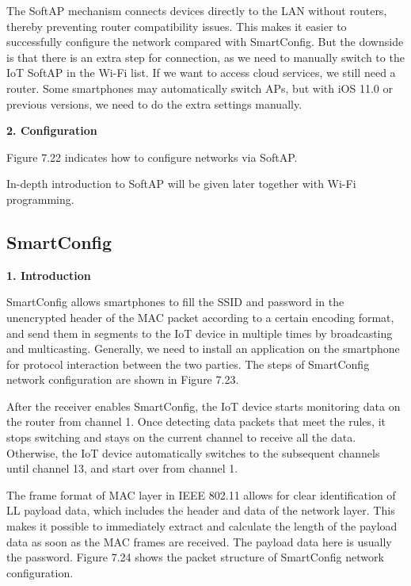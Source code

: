 \documentclass[a4paper,12pt,openany]{book}
\begin{document}
The SoftAP mechanism connects devices directly to the LAN without routers, thereby preventing router compatibility issues. This makes it easier to successfully configure the network compared with SmartConfig. But the downside is that there is an extra step for connection, as we need to manually switch to the IoT SoftAP in the Wi-Fi list. If we want to access cloud services, we still need a router. Some smartphones may automatically switch APs, but with iOS 11.0 or previous versions, we need to do the extra settings manually.

\textbf{2. Configuration}

Figure 7.22 indicates how to configure networks via SoftAP.

In-depth introduction to SoftAP will be given later together with Wi-Fi programming.

\subsection{SmartConfig}
\textbf{1. Introduction}

SmartConfig allows smartphones to fill the SSID and password in the unencrypted header of the MAC packet according to a certain encoding format, and send them in segments to the IoT device in multiple times by broadcasting and multicasting. Generally, we need to install an application on the smartphone for protocol interaction between the two parties. The steps of SmartConfig network configuration are shown in Figure 7.23.

After the receiver enables SmartConfig, the IoT device starts monitoring data on the router from channel 1. Once detecting data packets that meet the rules, it stops switching and stays on the current channel to receive all the data. Otherwise, the IoT device automatically switches to the subsequent channels until channel 13, and start over from channel 1.

The frame format of MAC layer in IEEE 802.11 allows for clear identification of LL payload data, which includes the header and data of the network layer. This makes it possible to immediately extract and calculate the length of the payload data as soon as the MAC frames are received. The payload data here is usually the password. Figure 7.24 shows the packet structure of SmartConfig network configuration.
\end{document}
